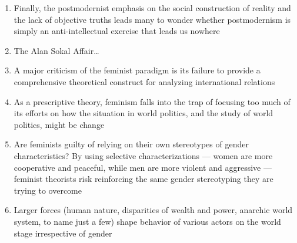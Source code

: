\documentclass[12pt]{article}
\begin{document}
\begin{enumerate}
\begin{enumerate}
          \item Finally, the postmodernist emphasis on the social construction of reality and the lack of objective truths leads many to wonder whether postmodernism is simply an anti-intellectual exercise that leads us nowhere

          \item The Alan Sokal Affair\dots

          \item A major criticism of the feminist paradigm is its failure to provide a comprehensive theoretical construct for analyzing international relations

          \item As a prescriptive theory, feminism falls into the trap of focusing too much of its efforts on how the situation in world politics, and the study of world politics, might be change

          \item Are feminists guilty of relying on their own stereotypes of gender characteristics? By using selective characterizations — women are more cooperative and peaceful, while men are more violent and aggressive — feminist theorists risk reinforcing the same gender stereotyping they are trying to overcome

          \item Larger forces (human nature, disparities of wealth and power, anarchic world system, to name just a few) shape behavior of various actors on the world stage irrespective of gender

        \end{enumerate}

    \end{enumerate}
\end{document}
